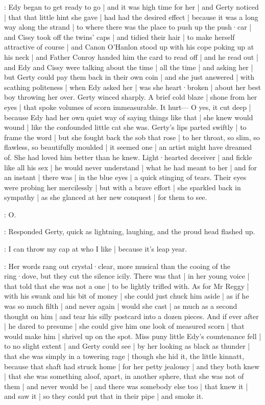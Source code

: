 :
Edy began to get ready to go |
and it was high time for her |
and Gerty noticed |
that that little hint she gave |
had had the desired effect |
because it was a long way
along the strand |%
to where there was the place
to push up the push·car |
and Cissy took off the twins' caps |
and tidied their hair |
to make herself attractive of course |
and Canon O'Hanlon stood up
with his cope poking up at his neck |
and Father Conroy handed him the card to read off |
and he read out  |
and Edy and Cissy were talking
about the time |
all the time |
and asking her |
but Gerty could pay them back in their own coin |
and she just answered |
with scathing politeness |
when Edy asked her |
was she heart·broken |
about her best boy throwing her over.
Gerty winced sharply.
A brief cold blaze |
shone from her eyes |
that spoke volumes of scorn immeasurable.
It hurt—%
O yes,
it cut deep |
because Edy had her own quiet way
of saying things like that |%
she knew would wound |
like the confounded little cat
she was.
Gerty's lips parted swiftly |
to frame the word |
but she fought back the sob that rose |
to her throat,
so slim,
so flawless,
so beautifully moulded |
it seemed one |
an artist might have dreamed of.
She had loved him better than he knew.
Light·hearted deceiver |
and fickle like all his sex |
he would never understand |
what he had meant to her |
and for an instant |
there was |
in the blue eyes |
a quick stinging of tears.
Their eyes were probing her mercilessly |
but with a brave effort |
she sparkled back in sympathy |
as she glanced at her new conquest |
for them to see.

\gerty:
O.

:
Responded Gerty,
quick as lightning,
laughing,
and the proud head flashed up.

\gerty:
I can throw my cap at who I like |%
because it's leap year.

:
Her words rang out crystal·clear,
more musical
than the cooing of the ring·dove,
but they cut the silence icily.
There was that |
in her young voice |
that told
that she was not a one |
to be lightly trifled with.
As for Mr Reggy |
with his swank and his bit of money |
she could just chuck him aside |
as if he was so much filth |
and never again |
would she cast |
as much as a second thought on him |
and tear his silly postcard into a dozen pieces.
And if ever after |
he dared to presume |
she could give him one look of measured scorn |
that would make him |
shrivel up on the spot.
Miss puny little Edy's countenance fell |
to no slight extent |
and Gerty could see |
by her looking as black as thunder |%
that she was simply in a towering rage |
though she hid it,
the little kinnatt,
because that shaft had struck home |
for her petty jealousy |
and they both knew |
that she was something aloof,
apart,
in another sphere,
that she was not of them |
and never would be |
and there was somebody else too |
that knew it |
and saw it |
so they could put that in their pipe |
and smoke it.

